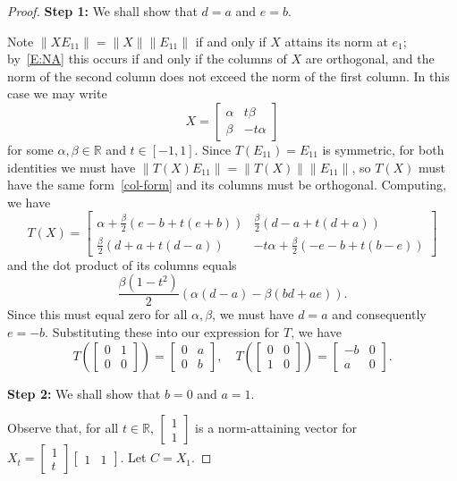 \documentclass[11pt]{article}
\numberwithin{equation}{section}
\def\IR{{\mathbb R}}
\begin{document}
\begin{proof}
	\textbf{Step 1:} We shall show that $d=a$ and $e=b$.

	Note $\|XE_{11}\| = \|X\| \|E_{11}\|$ if and only if $X$ attains its norm at $e_1$; by~\eqref{E:NA} this occurs if and only if the columns of $X$ are orthogonal, and the norm of the second column does not exceed the norm of the first column.  In this case we may write
	\begin{equation}\label{col-form}
		X = \begin{bmatrix} \alpha & t \beta \\ \beta & - t \alpha \end{bmatrix}
	\end{equation}
	for some $\alpha, \beta \in \IR$ and $t \in [-1,1]$.  Since $T(E_{11}) = E_{11}$ is symmetric, for both identities we must have $\|T(X) E_{11}\| = \|T(X)\| \|E_{11}\|$, so $T(X)$ must have the same form~\eqref{col-form} and its columns must be orthogonal.
	Computing, we have
	$$T(X) = \begin{bmatrix} \alpha + \frac{\beta}{2} (e-b+t(e+b)) & \frac{\beta}{2}(d-a+t(d+a)) \\ \frac{\beta}{2} (d+a+t(d-a)) & -t\alpha + \frac{\beta}{2}(-e-b+t(b-e)) \end{bmatrix}$$
		and the dot product of its columns equals
	$$\frac{\beta(1-t^2)}{2}(\alpha (d-a) - \beta (bd+ae)).$$
	Since this must equal zero for all $\alpha, \beta$, we must have $d=a$ and consequently $e=-b$.  Substituting these into our expression for $T$, we have
	$$T\left( \begin{bmatrix} 0 & 1 \\ 0 & 0 \end{bmatrix} \right) = \begin{bmatrix} 0 & a \\ 0 & b \end{bmatrix}, \quad T\left( \begin{bmatrix} 0 & 0 \\ 1 & 0 \end{bmatrix} \right) = \begin{bmatrix} -b & 0 \\ a & 0 \end{bmatrix}.$$

	\textbf{Step 2:} We shall show that $b=0$ and $a=1$.

	Observe that, for all $t \in \IR$, $\begin{bmatrix} 1 \\ 1 \end{bmatrix}$ is a norm-attaining vector for $X_t = \begin{bmatrix} 1 \\ t \end{bmatrix} \begin{bmatrix} 1 & 1 \end{bmatrix}$.  Let $C = X_1$.


\end{proof}
\end{document}
